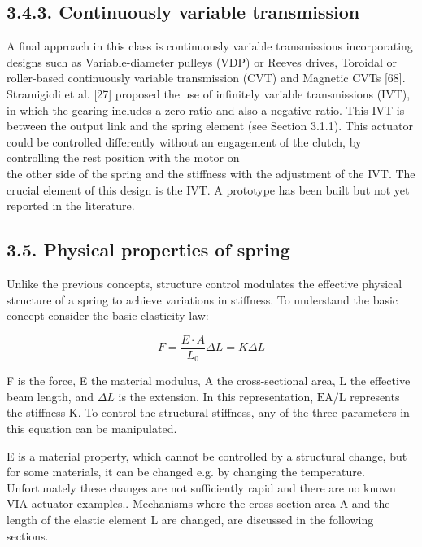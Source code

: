 \documentclass[10pt]{article}
\begin{document}
\subsection*{3.4.3. Continuously variable transmission}
A final approach in this class is continuously variable transmissions incorporating designs such as Variable-diameter pulleys (VDP) or Reeves drives, Toroidal or roller-based continuously variable transmission (CVT) and Magnetic CVTs [68]. Stramigioli et al. [27] proposed the use of infinitely variable transmissions (IVT), in which the gearing includes a zero ratio and also a negative ratio. This IVT is between the output link and the spring element (see Section 3.1.1). This actuator could be controlled differently without an engagement of the clutch, by controlling the rest position with the motor on\\
the other side of the spring and the stiffness with the adjustment of the IVT. The crucial element of this design is the IVT. A prototype has been built but not yet reported in the literature.

\subsection*{3.5. Physical properties of spring}
Unlike the previous concepts, structure control modulates the effective physical structure of a spring to achieve variations in stiffness. To understand the basic concept consider the basic elasticity law:


\begin{equation*}
F=\frac{E \cdot A}{L_{0}} \Delta L=K \Delta L \tag{1}
\end{equation*}


F is the force, E the material modulus, A the cross-sectional area, L the effective beam length, and $\Delta L$ is the extension. In this representation, $\mathrm{EA} / \mathrm{L}$ represents the stiffness K. To control the structural stiffness, any of the three parameters in this equation can be manipulated.

E is a material property, which cannot be controlled by a structural change, but for some materials, it can be changed e.g. by changing the temperature. Unfortunately these changes are not sufficiently rapid and there are no known VIA actuator examples.. Mechanisms where the cross section area A and the length of the elastic element L are changed, are discussed in the following sections.
\end{document}
